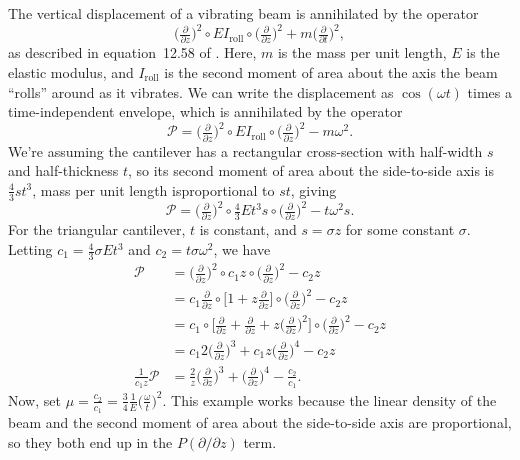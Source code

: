 \documentclass{article}
\theoremstyle{definition}
\theoremstyle{plain}
\newenvironment{verify}{\color{ForestGreen}}{\color{black}}
\begin{document}
{\begin{verify}
The vertical displacement of a vibrating beam is annihilated by the operator
\[ \big(\tfrac{\partial}{\partial z}\big)^2 \circ EI_\text{roll} \circ \big(\tfrac{\partial}{\partial z}\big)^2 + m \big(\tfrac{\partial}{\partial t}\big)^2, \]
as described in equation~12.58 of \cite{genta2009vibration}. Here, $m$ is the mass per unit length, $E$ is the elastic modulus, and $I_\text{roll}$ is the second moment of area about the axis the beam ``rolls'' around as it vibrates. We can write the displacement as $\cos(\omega t)$ times a time-independent envelope, which is annihilated by the operator
\[ \mathcal{P} = \big(\tfrac{\partial}{\partial z}\big)^2 \circ EI_\text{roll} \circ \big(\tfrac{\partial}{\partial z}\big)^2 - m\omega^2. \]
We're assuming the cantilever has a rectangular cross-section with half-width $s$ and half-thickness $t$, so its second moment of area about the side-to-side axis is $\tfrac{4}{3}st^3$, mass per unit length isproportional to $st$, giving
\[ \mathcal{P} = \big(\tfrac{\partial}{\partial z}\big)^2 \circ \tfrac{4}{3}Et^3 s \circ \big(\tfrac{\partial}{\partial z}\big)^2 - t\omega^2 s. \]
For the triangular cantilever, $t$ is constant, and $s = \sigma z$ for some constant $\sigma$. Letting $c_1 = \tfrac{4}{3}\sigma Et^3$ and $c_2 = t\sigma\omega^2$, we have
\begin{align*}
\mathcal{P} & = \big(\tfrac{\partial}{\partial z}\big)^2 \circ c_1 z \circ \big(\tfrac{\partial}{\partial z}\big)^2 - c_2 z \\
& = c_1 \tfrac{\partial}{\partial z} \circ \big[ 1 + z \tfrac{\partial}{\partial z} \big] \circ \big(\tfrac{\partial}{\partial z}\big)^2 - c_2 z \\
& = c_1 \circ \big[ \tfrac{\partial}{\partial z} + \tfrac{\partial}{\partial z} + z \big(\tfrac{\partial}{\partial z}\big)^2 \big] \circ \big(\tfrac{\partial}{\partial z}\big)^2 - c_2 z \\
& = c_1 2\big(\tfrac{\partial}{\partial z}\big)^3 + c_1 z \big(\tfrac{\partial}{\partial z}\big)^4 - c_2 z \\
\tfrac{1}{c_1 z} \mathcal{P} & = \tfrac{2}{z} \big(\tfrac{\partial}{\partial z}\big)^3 + \big(\tfrac{\partial}{\partial z}\big)^4 - \tfrac{c_2}{c_1}.
\end{align*}
Now, set $\mu = \tfrac{c_2}{c_1} = \tfrac{3}{4} \tfrac{1}{E} \big(\tfrac{\omega}{t}\big)^2$. This example works because the linear density of the beam and the second moment of area about the side-to-side axis are proportional, so they both end up in the $P(\partial/\partial z)$ term.\par

\end{verify}}
\end{document}
